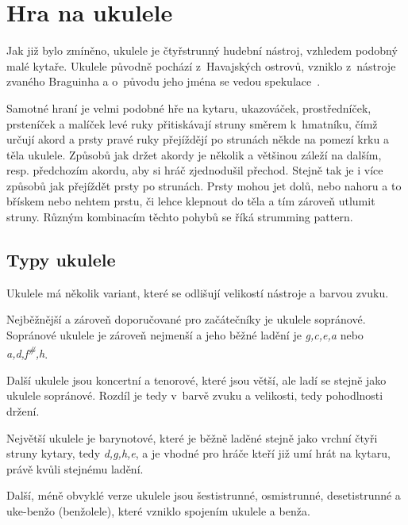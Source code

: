 \section{Hra na ukulele}
\label{sc:ukulele_playing}
Jak již bylo zmíněno, ukulele je čtyřstrunný hudební nástroj, vzhledem podobný malé kytaře. Ukulele původně pochází z~Havajských ostrovů, vzniklo z~nástroje zvaného Braguinha a o~původu jeho jména se vedou spekulace~\cite{rek_2008_kola}.

Samotné hraní je velmi podobné hře na kytaru, ukazováček, prostředníček, prsteníček a malíček levé ruky přitiskávají struny směrem k~hmatníku, čímž určují akord a prsty pravé ruky přejíždějí po strunách někde na pomezí krku a těla ukulele. Způsobů jak držet akordy je několik a většinou záleží na dalším, resp. předchozím akordu, aby si hráč zjednodušil přechod. Stejně tak je i více způsobů jak přejíždět prsty po strunách. Prsty mohou jet dolů, nebo nahoru a to břískem nebo nehtem prstu, či lehce klepnout do těla a tím zároveň utlumit struny. Různým kombinacím těchto pohybů se říká \gls{strumming pattern}.

\subsection{Typy ukulele}
\label{ss:ukulele_types}
Ukulele má několik variant, které se odlišují velikostí nástroje a barvou zvuku.

Nejběžnější a zároveň doporučované pro začátečníky je ukulele sopránové. Sopránové ukulele je zároveň nejmenší a jeho běžné ladění je \textit{g,c,e,a} nebo \textit{a,d,f\textsuperscript{\#},h}.

Další ukulele jsou koncertní a tenorové, které jsou větší, ale ladí se stejně jako ukulele sopránové. Rozdíl je tedy v~barvě zvuku a velikosti, tedy pohodlnosti držení.

Největší ukulele je barynotové, které je běžně laděné stejně jako vrchní čtyři struny kytary, tedy \textit{d,g,h,e}, a je vhodné pro hráče kteří již umí hrát na kytaru, právě kvůli stejnému ladění.

Další, méně obvyklé verze ukulele jsou šestistrunné, osmistrunné, desetistrunné a uke-benžo (benžolele), které vzniklo spojením ukulele a benža.
